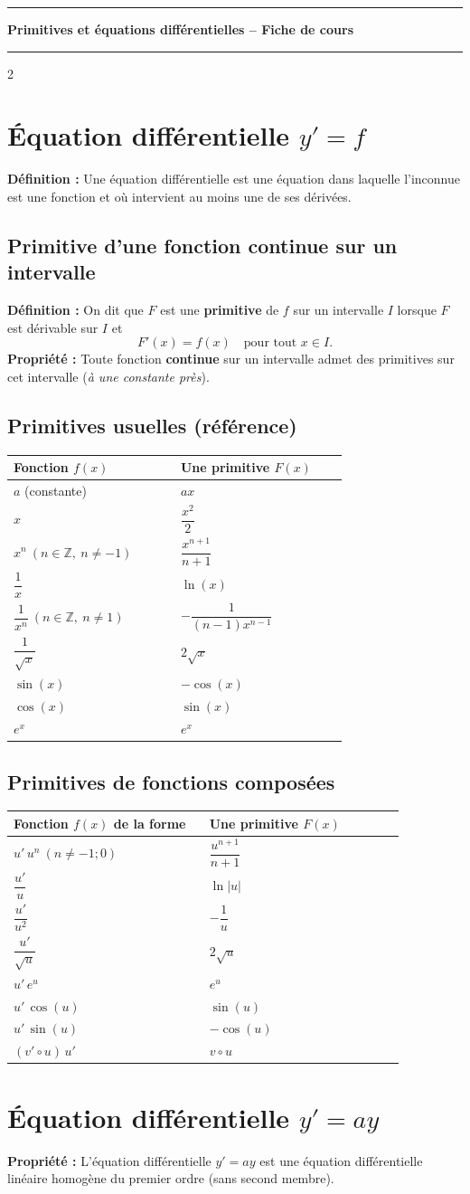 \documentclass[11pt,a4paper]{article}
\newcommand{\FicheTitre}{Primitives et équations différentielles -- Fiche de cours}
\newcommand{\TitreBandeau}[1]{%
  \noindent\hrule
  \vspace{0.55em}
  \begin{center}
    {\LARGE\bfseries #1}
  \end{center}
  \vspace{0.55em}
  \noindent\hrule
  \vspace{0.9em}
}
\newcommand{\defi}{\textbf{Définition :} }
\newcommand{\prop}{\textbf{Propriété :} }
\newcommand{\TableauPrimitivesUsuelles}{%
\begin{center}
\setlength{\tabcolsep}{10pt}
\renewcommand{\arraystretch}{1.6}
\begin{tabular}{|>{\centering\arraybackslash}m{0.43\linewidth}|>{\centering\arraybackslash}m{0.43\linewidth}|}
\hline
\rowcolor{blue!15}\textbf{Fonction $f(x)$} & \textbf{Une primitive $F(x)$} \\
\hline
$a$ (constante) & $ax$ \\
\hline
$x$ & $\dfrac{x^{2}}{2}$ \\
\hline
$x^{n}\ (n\in\mathbb{Z},\ n\neq -1)$ & $\dfrac{x^{n+1}}{n+1}$ \\
\hline
$\dfrac{1}{x}$ & $\ln(x)$ \\
\hline
$\dfrac{1}{x^{n}}\ (n\in\mathbb{Z},\ n\neq 1)$ & $-\dfrac{1}{(n-1)x^{n-1}}$ \\
\hline
$\dfrac{1}{\sqrt{x}}$ & $2\sqrt{x}$ \\
\hline
$\sin(x)$ & $-\cos(x)$ \\
\hline
$\cos(x)$ & $\sin(x)$ \\
\hline
$e^{x}$ & $e^{x}$ \\
\hline
\end{tabular}
\end{center}

}
\newcommand{\TableauPrimitivesComposees}{%
\begin{center}
\setlength{\tabcolsep}{10pt}
\renewcommand{\arraystretch}{1.8}
\begin{tabular}{|>{\centering\arraybackslash}m{0.43\linewidth}|>{\centering\arraybackslash}m{0.43\linewidth}|}
\hline
\rowcolor{blue!15}\textbf{Fonction $f(x)$ de la forme} & \textbf{Une primitive $F(x)$} \\
\hline

$u'\,u^{n}\ (n\neq -1;0)$ & $\dfrac{u^{n+1}}{n+1}$ \\
\hline
$\dfrac{u'}{u}$ & $\ln|u|$ \\
\hline
$\dfrac{u'}{u^{2}}$ & $-\dfrac{1}{u}$ \\
\hline
$\dfrac{u'}{\sqrt{u}}$ & $2\sqrt{u}$ \\
\hline
$u'\,e^{u}$ & $e^{u}$ \\
\hline
$u'\,\cos(u)$ & $\sin(u)$ \\
\hline
$u'\,\sin(u)$ & $-\cos(u)$ \\
\hline
$(v'\!\circ u)\,u'$ & $v\!\circ u$ \\


\hline
\end{tabular}
\end{center}

}
\begin{document}
\TitreBandeau{\FicheTitre}

\setlength{\columnsep}{1.2cm}
\setlength{\columnseprule}{0.6pt}
\def\columnseprulecolor{\color{black}}

\begin{paracol}{2}

\section{Équation différentielle $y'=f$}

\defi Une équation différentielle est une équation dans laquelle
l'inconnue est une fonction et où intervient au moins une de ses dérivées.

\subsection{Primitive d'une fonction continue sur un intervalle}
\defi On dit que $F$ est une \textbf{primitive} de $f$ sur un intervalle $I$
lorsque $F$ est dérivable sur $I$ et
\[
F'(x)=f(x)\quad \text{pour tout } x\in I.
\]
\prop Toute fonction \textbf{continue} sur un intervalle admet des primitives sur cet intervalle
(\textit{à une constante près}).

\subsection{Primitives usuelles (référence)}
\TableauPrimitivesUsuelles

\switchcolumn
\setcounter{section}{1}
\setcounter{subsection}{2}

\subsection{Primitives de fonctions composées}
\TableauPrimitivesComposees



\setcounter{section}{1}

\section{Équation différentielle $y'=ay$}

\prop L'équation différentielle $y'=ay$ est une équation différentielle linéaire homogène
du premier ordre (sans second membre).


\end{paracol}
\end{document}
